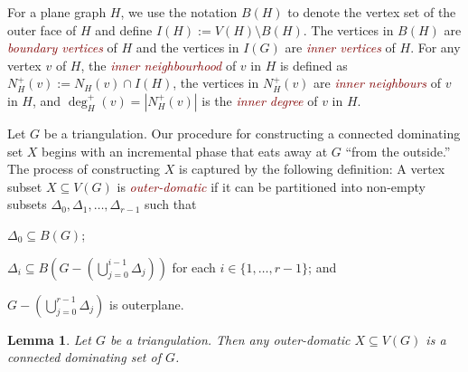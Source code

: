 \documentclass[a4paper,UKenglish,cleveref, autoref, thm-restate]{lipics-v2021}
\newtheorem{lem}{Lemma}
\newcommand{\defin}[1]{\emph{\textcolor{Maroon}{#1}}}
\begin{document}
For a plane graph $H$, we use the notation $B(H)$ to denote the vertex set of the outer face of $H$ and define $I(H):=V(H)\setminus B(H)$.  The vertices in $B(H)$ are \defin{boundary vertices} of $H$ and the vertices in $I(G)$ are \defin{inner vertices} of $H$. For any vertex $v$ of $H$, the \defin{inner neighbourhood} of $v$ in $H$ is defined as $N_H^+(v):=N_H(v)\cap I(H)$, the vertices in $N^+_H(v)$ are \defin{inner neighbours} of $v$ in $H$, and $\deg^+_H(v)=|N^+_H(v)|$ is the \defin{inner degree} of $v$ in $H$.

Let $G$ be a triangulation.  Our procedure for constructing a connected dominating set $X$ begins with an incremental phase that eats away at $G$ ``from the outside.'' The process of constructing $X$ is captured by the following definition:   A vertex subset $X\subseteq V(G)$ is \defin{outer-domatic} if it can be partitioned into non-empty subsets $\Delta_0,\Delta_1,\ldots,\Delta_{r-1}$ such that
\begin{compactenum}[(P1)]
    \item $\Delta_0\subseteq B(G)$; \label{outer_face}
    \item $\Delta_i\subseteq B(G-(\bigcup_{j=0}^{i-1}\Delta_j))$ for each $i\in\{1,\ldots,r-1\}$; and \label{incremental}
    \item $G-(\bigcup_{j=0}^{r-1}\Delta_j)$ is outerplane. \label{outerplanar}
\end{compactenum}

\begin{lem}\label{outer_domatic}
    Let $G$ be a triangulation.  Then any outer-domatic $X\subseteq V(G)$ is a connected dominating set of $G$.
\end{lem}
\end{document}
